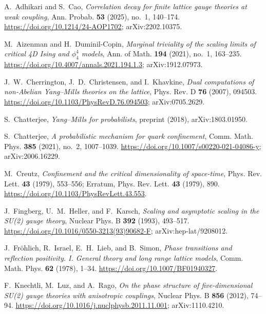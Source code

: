 
A.~Adhikari and S.~Cao, \emph{Correlation decay for finite lattice gauge theories at weak coupling},
Ann. Probab. \textbf{53} (2025), no.~1, 140--174.
\url{https://doi.org/10.1214/24-AOP1702}; arXiv:2202.10375.

M.~Aizenman and H.~Duminil-Copin, \emph{Marginal triviality of the scaling limits of critical 4D Ising and $\phi_4^4$ models},
Ann. of Math. \textbf{194} (2021), no.~1, 163--235.
\url{https://doi.org/10.4007/annals.2021.194.1.3}; arXiv:1912.07973.

J.~W.~Cherrington, J.~D.~Christensen, and I.~Khavkine, \emph{Dual computations of non-Abelian Yang--Mills theories on the lattice},
Phys. Rev. D \textbf{76} (2007), 094503.
\url{https://doi.org/10.1103/PhysRevD.76.094503}; arXiv:0705.2629.

S.~Chatterjee, \emph{Yang--Mills for probabilists}, preprint (2018), arXiv:1803.01950.

S.~Chatterjee, \emph{A probabilistic mechanism for quark confinement},
Comm. Math. Phys. \textbf{385} (2021), no.~2, 1007--1039.
\url{https://doi.org/10.1007/s00220-021-04086-y}; arXiv:2006.16229.

M.~Creutz, \emph{Confinement and the critical dimensionality of space-time},
Phys. Rev. Lett. \textbf{43} (1979), 553--556; Erratum, Phys. Rev. Lett. \textbf{43} (1979), 890.
\url{https://doi.org/10.1103/PhysRevLett.43.553}.

J.~Fingberg, U.~M.~Heller, and F.~Karsch, \emph{Scaling and asymptotic scaling in the SU(2) gauge theory},
Nuclear Phys. B \textbf{392} (1993), 493--517.
\url{https://doi.org/10.1016/0550-3213(93)90682-F}; arXiv:hep-lat/9208012.

J.~Fr\"ohlich, R.~Israel, E.~H.~Lieb, and B.~Simon, \emph{Phase transitions and reflection positivity. I. General theory and long range lattice models},
Comm. Math. Phys. \textbf{62} (1978), 1--34.
\url{https://doi.org/10.1007/BF01940327}.

F.~Knechtli, M.~Luz, and A.~Rago, \emph{On the phase structure of five-dimensional SU(2) gauge theories with anisotropic couplings},
Nuclear Phys. B \textbf{856} (2012), 74--94.
\url{https://doi.org/10.1016/j.nuclphysb.2011.11.001}; arXiv:1110.4210.

